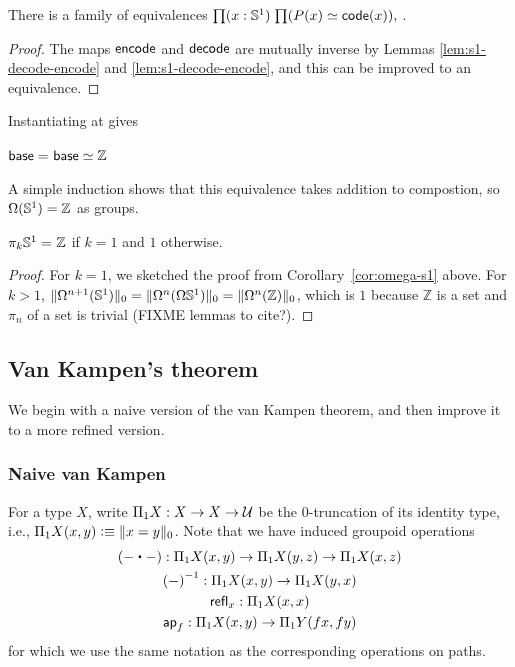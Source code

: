 \begin{thm}
There is a family of equivalences $\prd{x : \Sn ^1} {\eqv {P(x)} {\code(x)}}$.  
\end{thm}
\begin{proof}
The maps $\encode$ and $\decode$ are mutually inverse by 
Lemmas \ref{lem:s1-decode-encode} and \ref{lem:s1-decode-encode},
and this can be improved to an equivalence.  
\end{proof}

Instantiating at {\base} gives
\begin{cor}\label{cor:omega-s1}
$\eqv {\id{\base}{\base}} {\mathbb{Z}}$
\end{cor}

A simple induction shows that this equivalence takes addition to
compostion, so $\Omega(\Sn ^1) = \mathbb{Z}$ as groups.  

\begin{cor}
$\id{\pi_k{\Sn ^1}} {\mathbb{Z}}$ if $k = 1$ and $1$ otherwise.  
\end{cor}
\begin{proof}
For $k=1$, we sketched the proof from Corollary~\ref{cor:omega-s1} above.
For $k > 1$, $\trunc 0 {\Omega^{n+1}(\Sn ^1)} = \trunc 0
{\Omega^n(\Omega{\Sn ^1})} = \trunc 0 {\Omega^n(\mathbb{Z})}$, which is
  $1$ because $\mathbb{Z}$ is a set and $\pi_n$ of a set is trivial (FIXME
  lemmas to cite?).
\end{proof}


\subsection{Van Kampen's theorem}
\label{sec:van-kampen}

We begin with a naive version of the van Kampen theorem, and then improve it to a more refined version.

\subsubsection{Naive van Kampen}
\label{sec:naive}

For a type $X$, write $\Pi_1 X: X\to X\to \type$ be the $0$-truncation of its identity type, i.e., $\Pi_1 X(x,y) \defeq \trunc0{x=y}$.
Note that we have induced groupoid operations
\begin{gather*}
  (-\ct-) : \Pi_1X(x,y) \to \Pi_1X(y,z) \to \Pi_1X(x,z)\\
  \opp{(-)} : \Pi_1X(x,y) \to \Pi_1X(y,x)\\
  \refl{x} : \Pi_1X(x,x)\\
  \apfunc{f} : \Pi_1X(x,y) \to \Pi_1Y(fx,fy)
\end{gather*}
for which we use the same notation as the corresponding operations on paths.

